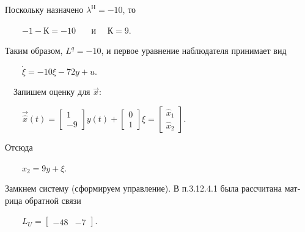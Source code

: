 \documentclass[a4paper]{article}
\begin{document}
{\begin{russian}\sffamily
Поскольку назначено  $λ^Н=-10$, то \ 
\end{russian}}

{\begin{russian}\sffamily
\ \ \ \  $-1-К=-10$ \ \ \ и \ \  $К=9$.
\end{russian}}

{\begin{russian}\sffamily
Таким образом,  $L^q=-10$, и первое уравнение наблюдателя принимает вид
\end{russian}}

{\begin{russian}\sffamily
\ \ \ \  $\dot ξ=-10ξ-72y+u$.
\end{russian}}

{\begin{russian}\sffamily
\ \ Запишем оценку для  $\vec x$:
\end{russian}}

{\begin{russian}\sffamily
\ \ \ \  $\vec{\hat
x}(t)=\left[\begin{matrix}1\\-9\end{matrix}\right]y(t)+\left[\begin{matrix}0\\1\end{matrix}\right]ξ=\left[\begin{matrix}\hat
x_1\\\hat x_2\end{matrix}\right]$.
\end{russian}}

{\begin{russian}\sffamily
Отсюда
\end{russian}}

{\begin{russian}\sffamily
\ \ \ \  $\hat x_2=9y+ξ$.
\end{russian}}

{\begin{russian}\sffamily
Замкнем систему (сформируем управление). В п.3.12.4.1 была рассчитана матрица обратной связи
\end{russian}}

{\begin{russian}\sffamily
\ \ \ \  $L_U=\left[\begin{matrix}-48&-7\end{matrix}\right]$.
\end{russian}}
\end{document}
